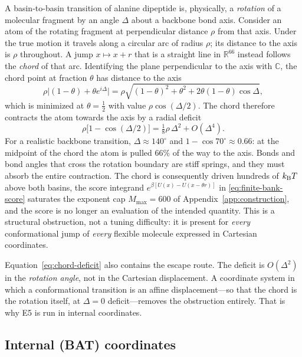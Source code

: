 \documentclass[11pt]{article}
\newcommand{\R}{\mathbb{R}}
\begin{document}
A basin-to-basin transition of alanine dipeptide is, physically, a
\emph{rotation} of a molecular fragment by an angle $\Delta$ about a backbone
bond axis.  Consider an atom of the rotating fragment at perpendicular distance
$\rho$ from that axis.  Under the true motion it travels along a circular arc
of radius $\rho$; its distance to the axis is $\rho$ throughout.  A jump
$x\mapsto x+r$ that is a straight line in $\R^{66}$ instead follows the
\emph{chord} of that arc.  Identifying the plane perpendicular to the axis with
$\mathbb{C}$, the chord point at fraction $\theta$ has distance to the axis
\begin{equation}
 \rho\bigl|(1-\theta)+\theta e^{i\Delta}\bigr|
 =\rho\sqrt{(1-\theta)^2+\theta^2+2\theta(1-\theta)\cos\Delta},
\end{equation}
which is minimized at $\theta=\tfrac12$ with value $\rho\cos(\Delta/2)$.  The
chord therefore contracts the atom towards the axis by a radial deficit
\begin{equation}
 \rho\bigl[1-\cos(\Delta/2)\bigr]=\tfrac18\rho\,\Delta^2+O(\Delta^4).
 \label{eq:chord-deficit}
\end{equation}
For a realistic backbone transition, $\Delta\approx140^\circ$ and
$1-\cos70^\circ\approx0.66$: at the midpoint of the chord the atom is pulled
$66\%$ of the way to the axis.  Bonds and bond angles that cross the rotation
boundary are stiff springs, and they must absorb the entire contraction.  The
chord is consequently driven hundreds of $k_{\rm B}T$ above both basins, the
score integrand $e^{\beta[U(x)-U(x-\theta r)]}$ in
\eqref{eq:finite-bank-score} saturates the exponent cap $M_{\max}=600$ of
Appendix~\ref{app:construction}, and the score is no longer an evaluation of
the intended quantity.  This is a structural obstruction, not a tuning
difficulty: it is present for \emph{every} conformational jump of \emph{every}
flexible molecule expressed in Cartesian coordinates.

Equation~\eqref{eq:chord-deficit} also contains the escape route.  The deficit
is $O(\Delta^2)$ in the \emph{rotation angle}, not in the Cartesian
displacement.  A coordinate system in which a conformational transition is an
affine displacement---so that the chord is the rotation itself, at $\Delta=0$
deficit---removes the obstruction entirely.  That is why E5 is run in internal
coordinates.

\subsection{Internal (BAT) coordinates}
\label{app:e5-bat}
\end{document}
